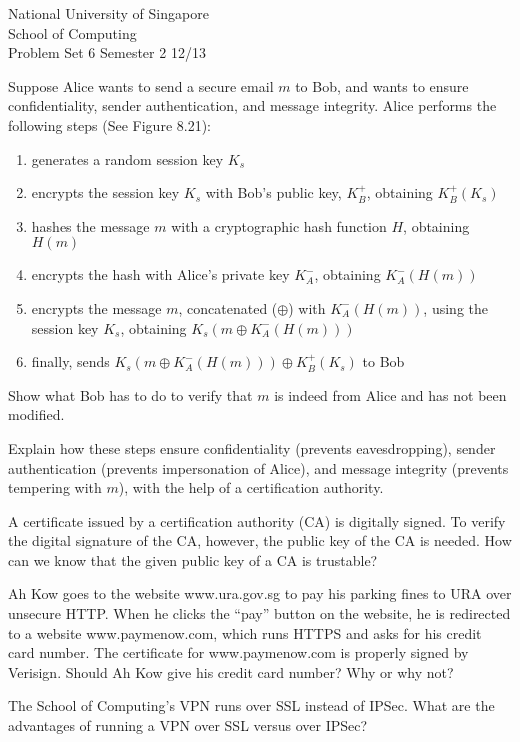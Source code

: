 \documentclass[a4paper,11pt]{exam}
\begin{document}
    \extraheadheight{.5in}
    {\large\sf National University of Singapore\\ School of Computing \\
    \LARGE\sf Problem Set 6}%
    {\large\sf Semester 2 12/13}
    \firstpageheadrule
    \pagestyle{headandfoot}

    \begin{questions}

\question Suppose Alice wants to send a secure email $m$ to Bob, and wants to ensure confidentiality, sender authentication, and message integrity.  Alice performs the following steps (See Figure 8.21):
\begin{enumerate}
	\item generates a random session key $K_s$ 
	\item encrypts the session key $K_s$ with Bob's public key, $K_B^+$, obtaining $K_B^+(K_s)$
	\item hashes the message $m$ with a cryptographic hash function $H$, obtaining $H(m)$  \label{hash}
	\item encrypts the hash with Alice's private key $K_A^-$, obtaining $K_A^-(H(m))$ \label{private}
	\item encrypts the message $m$, concatenated ($\oplus$) with $K_A^-(H(m))$, using the session key $K_s$, obtaining $K_s(m \oplus K_A^-(H(m)))$
	\item finally, sends $K_s(m \oplus K_A^-(H(m))) \oplus K_B^+(K_s)$ to Bob
\end{enumerate}

Show what Bob has to do to verify that $m$ is indeed from Alice and has not been modified.

Explain how these steps ensure confidentiality (prevents eavesdropping), sender authentication (prevents impersonation of Alice), and message integrity (prevents tempering with $m$), with the help of a certification authority.

\question A certificate issued by a certification authority (CA) is digitally signed.  To verify the digital signature of the CA, however, the public key of the CA is needed.  How can we know that the given public key of a CA is trustable?

\question Ah Kow goes to the website www.ura.gov.sg to pay his parking fines to URA over unsecure HTTP.  When he clicks the ``pay'' button on the website, he is redirected to a website www.paymenow.com, which runs HTTPS and asks for his credit card number.  The certificate for www.paymenow.com is properly signed by Verisign.  Should Ah Kow give his credit card number?  Why or why not?

\question The School of Computing's VPN runs over SSL instead of IPSec.  
What are the advantages of running a VPN over SSL versus over IPSec?  

\end{questions}
\end{document}
